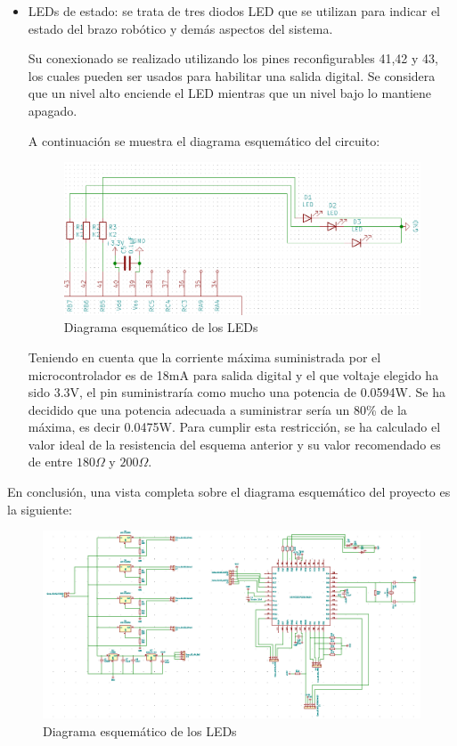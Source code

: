 \begin{itemize}
    
    \item LEDs de estado: se trata de tres diodos LED que se utilizan para indicar el estado del brazo robótico y demás aspectos del sistema. 
    
    Su conexionado se realizado utilizando los pines reconfigurables 41,42 y 43, los cuales pueden ser usados para habilitar una salida digital. Se considera que un nivel alto enciende el LED mientras que un nivel bajo lo mantiene apagado.
    
    A continuación se muestra el diagrama esquemático del circuito:
    
    \begin{figure}[H]
    \centering 
    \includegraphics[width=.75\linewidth]{pictures/LEDS.PNG}
    \caption{Diagrama esquemático de los LEDs}
    \label{fig:kdiagram}
    \end{figure}

    Teniendo en cuenta que la corriente máxima suministrada  por el microcontrolador es de 18mA para salida digital y el que voltaje elegido ha sido 3.3V, el pin suministraría como mucho una potencia de 0.0594W. Se ha decidido que una potencia adecuada a suministrar sería un 80\% de la máxima, es decir 0.0475W. Para cumplir esta restricción, se ha calculado el valor ideal de la resistencia del esquema anterior y su valor recomendado es de entre $180 \Omega$ y $200 \Omega$.
    
\end{itemize}

En conclusión, una vista completa sobre el diagrama esquemático del proyecto es la siguiente:

    \begin{figure}[H]
    \centering 
    \includegraphics[width=1.05\linewidth]{pictures/EsquematicoCompleto.PNG}
    \caption{Diagrama esquemático de los LEDs}
    \label{fig:kdiagram}
    \end{figure}

